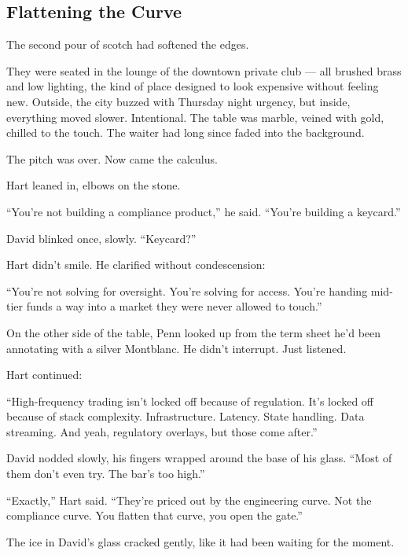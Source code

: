 \subsection{Flattening the Curve}


The second pour of scotch had softened the edges.

They were seated in the lounge of the downtown private club — all brushed brass and low lighting, the kind of place 
designed to look expensive without feeling new. Outside, the city buzzed with Thursday night urgency, but inside, 
everything moved slower. Intentional. The table was marble, veined with gold, chilled to the touch. The waiter had 
long since faded into the background.

The pitch was over. Now came the calculus.

Hart leaned in, elbows on the stone.

“You’re not building a compliance product,” he said. “You’re building a keycard.”

David blinked once, slowly. “Keycard?”

Hart didn’t smile. He clarified without condescension:

“You’re not solving for oversight. You’re solving for access. You’re handing mid-tier funds a way into a market they were 
never allowed to touch.”

On the other side of the table, Penn looked up from the term sheet he’d been annotating with a silver Montblanc. He didn’t 
interrupt. Just listened.

Hart continued:

“High-frequency trading isn’t locked off because of regulation. It’s locked off because of stack complexity. 
Infrastructure. Latency. State handling. Data streaming. And yeah, regulatory overlays, but those come after.”

David nodded slowly, his fingers wrapped around the base of his glass. “Most of them don’t even try. The bar’s too high.”

“Exactly,” Hart said. “They’re priced out by the engineering curve. Not the compliance curve. You flatten that curve, you 
open the gate.”

The ice in David’s glass cracked gently, like it had been waiting for the moment.


\medskip

